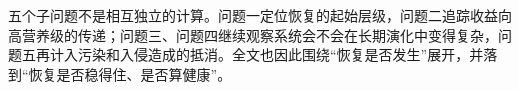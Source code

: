 五个子问题不是相互独立的计算。问题一定位恢复的起始层级，问题二追踪收益向高营养级的传递；问题三、问题四继续观察系统会不会在长期演化中变得复杂，问题五再计入污染和入侵造成的抵消。全文也因此围绕“恢复是否发生”展开，并落到“恢复是否稳得住、是否算健康”。
